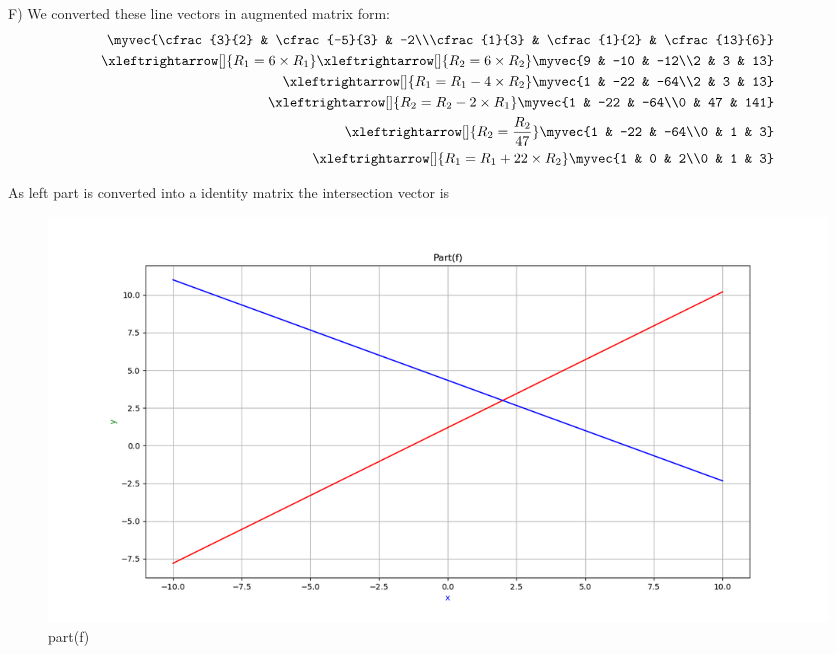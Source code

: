 \begin{enumerate}[label=\thesection.\arabic*.,ref=\thesection.\theenumi]
F)
We converted these line vectors in augmented matrix form:\\ 

\begin{align*}
    \myvec{\cfrac{3}{2} & \cfrac{-5}{3} & -2\\\cfrac{1}{3} & \cfrac{1}{2} & \cfrac{13}{6}}
\\
    \xleftrightarrow[]{R_{1}=6\times R_{1}}
    \xleftrightarrow[]{R_{2}=6\times R_{2}} \myvec{9 & -10 & -12\\2 & 3 & 13}
\\
    \xleftrightarrow[]{R_{1}=R_{1}-4\times R_{2}} \myvec{1 & -22 & -64\\2 & 3 & 13}
\\
    \xleftrightarrow[]{R_{2}=R_{2}-2\times R_{1}}  \myvec{1 & -22 & -64\\0 & 47 & 141}
\\
    \xleftrightarrow[]{R_{2}=\frac{R_{2}}{47}}  \myvec{1 & -22 & -64\\0 & 1 & 3}
\\
    \xleftrightarrow[]{R_{1}=R_{1}+22\times R_{2}} \myvec{1 & 0 & 2\\0 & 1 & 3}
\end{align*}

As left part is converted into a identity matrix the intersection vector is \\

\renewcommand{\thefigure}{\theenumi.\arabic{figure}}
\begin{figure}[!ht]
    \centering
    \includegraphics[width=\columnwidth]{./figures/A1_partf}
\caption{part(f)}
\label{fig: part(f)}
\end{figure}

\end{enumerate}


